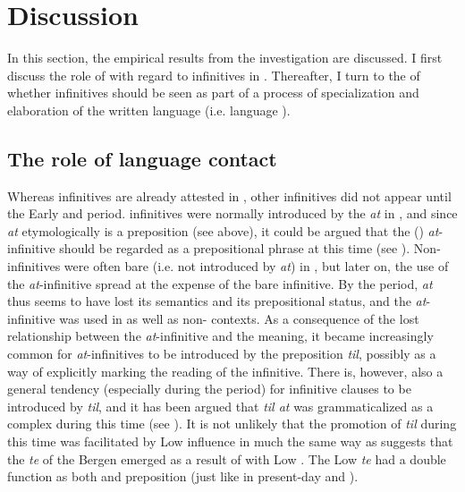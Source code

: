 \documentclass[output=paper]{langscibook}
\begin{document}
\section{Discussion}\label{sec:kalm:5}

In this section, the empirical results from the investigation are discussed. I first discuss the role of  with regard to  infinitives in . Thereafter, I turn to the  of whether  infinitives should be seen as part of a process of specialization and elaboration of the written language (i.e. language ). 


\subsection{The role of language contact}\label{sec:kalm:5.1}

Whereas  infinitives are already attested in , other  infinitives did not appear until the Early and  period.  infinitives were normally introduced by the  \textit{at} in , and since \textit{at} etymologically is a preposition (see  above), it could be argued that the () \textit{at}{}-infinitive should be regarded as a prepositional phrase at this time (see \citealt{Kalm2016Satsekvivalenta}). Non- infinitives were often bare (i.e. not introduced by \textit{at}) in , but later on, the use of the \textit{at}{}-infinitive spread at the expense of the bare infinitive. By the  period, \textit{at} thus seems to have lost its  semantics and its prepositional status, and the \textit{at}{}-infinitive was used in  as well as non- contexts. As a consequence of the lost relationship between the \textit{at}{}-infinitive and the  meaning, it became increasingly common for  \textit{at}{}-infinitives to be introduced by the preposition \textit{til}, possibly as a way of explicitly marking the  reading of the infinitive. There is, however, also a general tendency (especially during the  period) for infinitive clauses to be introduced by \textit{til}, and it has been argued that \textit{til at} was grammaticalized as a complex  during this time (see \citealt{Kalm2014,Kalm2016Satsekvivalenta}). It is not unlikely that the promotion of \textit{til} during this time was facilitated by Low  influence in much the same way as \citet{Nesse2002} suggests that the  \textit{te} of the  Bergen  emerged as a result of  with Low . The Low  \textit{te} had a double function as both  and preposition (just like in present-day  and ).
\end{document}

